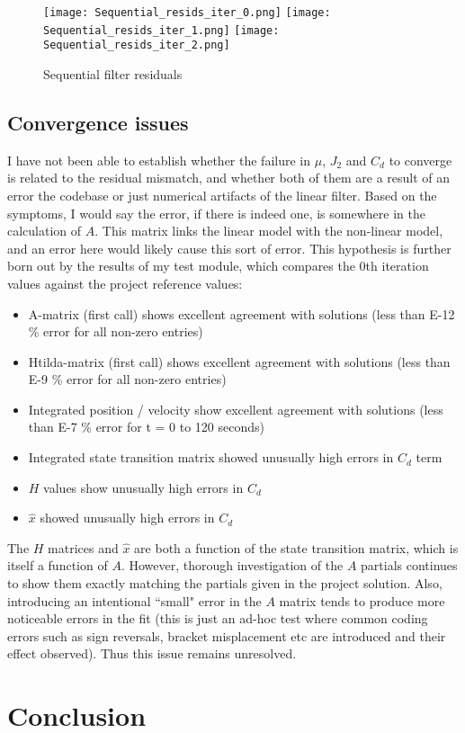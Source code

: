\documentclass[10pt]{article}
\begin{document}
\begin{figure}[htbp]
\begin{center}
\texttt{[image: Sequential\_resids\_iter\_0.png]}
\texttt{[image: Sequential\_resids\_iter\_1.png]}
\texttt{[image: Sequential\_resids\_iter\_2.png]}
\caption{Sequential filter residuals}
\end{center}
\end{figure}

\subsection{Convergence issues}

I have not been able to establish whether the failure in  $\mu$, $J_2$ and $C_d$ to converge is related to the residual mismatch, and whether both of them are a result of an error the codebase or just numerical artifacts of the linear filter. Based on the symptoms, I would say the error, if there is indeed one, is somewhere in the calculation of  $A$. This matrix links the linear model with the non-linear model, and an error here would likely cause this sort of error. This hypothesis is further born out by the results of my test module, which compares the 0th iteration values against the project reference values:

\begin{itemize}
\item A-matrix (first call) shows excellent agreement with solutions (less than E-12 \% error for all non-zero entries)
\item Htilda-matrix (first call) shows excellent agreement with solutions (less than E-9 \% error for all non-zero entries)
\item Integrated position / velocity show excellent agreement with solutions (less than E-7 \% error for t = 0 to 120 seconds)
\item Integrated state transition matrix showed unusually high errors in $C_d$ term
\item $H$ values show unusually high errors in $C_d$
\item $\hat{x}$ showed unusually high errors in $C_d$
\end{itemize}

The $H$ matrices and $\hat{x}$ are both a function of the state transition matrix, which is itself a function of $A$. However, thorough investigation of the $A$ partials continues to show them exactly matching the partials given in the project solution. Also, introducing an intentional ``small" error in the $A$ matrix tends to produce more noticeable errors in the fit (this is just an ad-hoc test where common coding errors such as sign reversals, bracket misplacement etc are introduced and their effect observed). Thus this issue remains unresolved.

\section{Conclusion}
\end{document}
